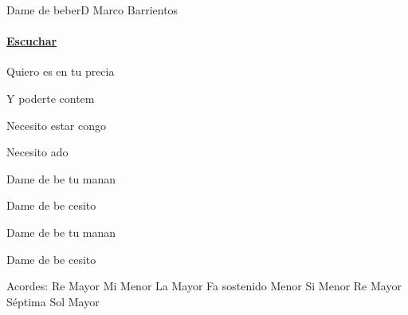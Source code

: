 \documentclass[12pt, spanish]{book}
\newcommand{\NotCCLIed}{\relax}
\begin{document}
    \begin{song}{Dame de beber}{D}
    {} %
    {Marco Barrientos}
    {} %
    {} %
        \ifChordBk
        \paragraph{\mbox{}\hfill\protect\href{https://open.spotify.com/intl-es/track/6o3ErDVIenw0j4ZrP7nJkC}{Escuchar}\mbox{}\hfill}
        \fi


        \begin{SBOpGroup}
            Quiero es en tu precia

            Y poderte contem

            Necesito estar congo

            Necesito ado
        \end{SBOpGroup}

        \begin{SBChorus}
            Dame de be   tu manan

            Dame de be  cesito 

            Dame de be   tu manan

            Dame de be  cesito 
        \end{SBChorus}

        \ifChordBk
        \begin{SBOpGroup}
            Acordes:
            \upchord{\D}\qquad Re Mayor \hfill
            \upchord{\Em}\qquad Mi Menor \hfill\null\break
            \upchord{\A}\qquad La Mayor \hfill
            \upchord{\Fsm}Fa sostenido Menor \hfill\null\break
            \upchord{\Bm}\qquad\qquad Si Menor \hfill
            \upchord{\Dseven}Re Mayor S\'eptima \hfill\null\break
            \upchord{\G}\qquad Sol Mayor \hfill
        \end{SBOpGroup}
        \fi
    \end{song}
\end{document}
